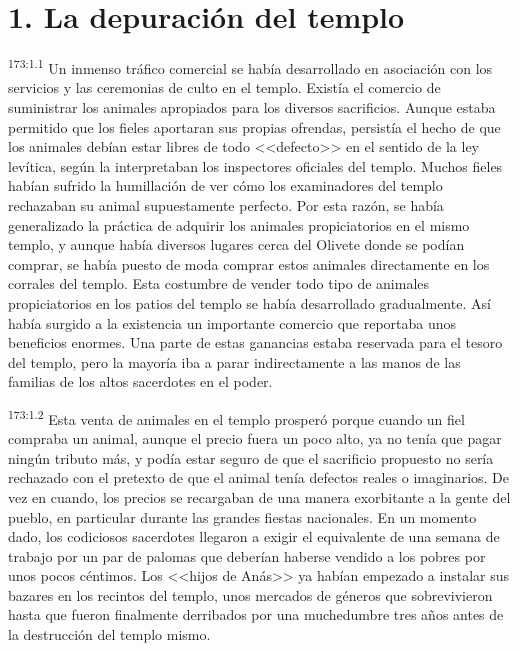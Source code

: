 \section*{1. La depuración del templo}
\par 
\textsuperscript{173:1.1} Un inmenso tráfico comercial se había desarrollado en asociación con los servicios y las ceremonias de culto en el templo. Existía el comercio de suministrar los animales apropiados para los diversos sacrificios. Aunque estaba permitido que los fieles aportaran sus propias ofrendas, persistía el hecho de que los animales debían estar libres de todo <<defecto>> en el sentido de la ley levítica, según la interpretaban los inspectores oficiales del templo. Muchos fieles habían sufrido la humillación de ver cómo los examinadores del templo rechazaban su animal supuestamente perfecto. Por esta razón, se había generalizado la práctica de adquirir los animales propiciatorios en el mismo templo, y aunque había diversos lugares cerca del Olivete donde se podían comprar, se había puesto de moda comprar estos animales directamente en los corrales del templo. Esta costumbre de vender todo tipo de animales propiciatorios en los patios del templo se había desarrollado gradualmente. Así había surgido a la existencia un importante comercio que reportaba unos beneficios enormes. Una parte de estas ganancias estaba reservada para el tesoro del templo, pero la mayoría iba a parar indirectamente a las manos de las familias de los altos sacerdotes en el poder.

\par 
\textsuperscript{173:1.2} Esta venta de animales en el templo prosperó porque cuando un fiel compraba un animal, aunque el precio fuera un poco alto, ya no tenía que pagar ningún tributo más, y podía estar seguro de que el sacrificio propuesto no sería rechazado con el pretexto de que el animal tenía defectos reales o imaginarios. De vez en cuando, los precios se recargaban de una manera exorbitante a la gente del pueblo, en particular durante las grandes fiestas nacionales. En un momento dado, los codiciosos sacerdotes llegaron a exigir el equivalente de una semana de trabajo por un par de palomas que deberían haberse vendido a los pobres por unos pocos céntimos. Los <<hijos de Anás>> ya habían empezado a instalar sus bazares en los recintos del templo, unos mercados de géneros que sobrevivieron hasta que fueron finalmente derribados por una muchedumbre tres años antes de la destrucción del templo mismo.

